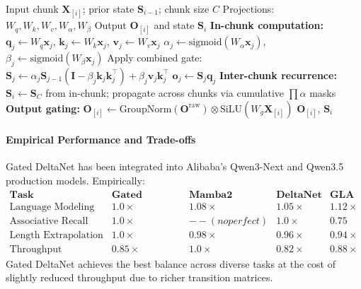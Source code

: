 \begin{algorithm}[H]
\caption{Gated DeltaNet Parallel Chunkwise Forward}
\begin{algorithmic}[1]
\Require Input chunk  $\mathbf{X}_{[i]}$; prior state $\mathbf{S}_{i-1}$; chunk size $C$
\Require Projections: $W_q, W_k, W_v, W_\alpha, W_\beta$
\Ensure Output $\mathbf{O}_{[i]}$ and state $\mathbf{S}_i$
\State \textbf{In-chunk computation:}
    \State $\mathbf{q}_j \gets W_q \mathbf{x}_j$, $\mathbf{k}_j \gets W_k \mathbf{x}_j$, $\mathbf{v}_j \gets W_v \mathbf{x}_j$
    \State $\alpha_j \gets \text{sigmoid}(W_\alpha \mathbf{x}_j)$, $\beta_j \gets \text{sigmoid}(W_\beta \mathbf{x}_j)$
    \State Apply combined gate: $\mathbf{S}_j \gets \alpha_j \mathbf{S}_{j-1}(\mathbf{I} - \beta_j \mathbf{k}_j \mathbf{k}_j^\top) + \beta_j \mathbf{v}_j \mathbf{k}_j^\top$
    \State $\mathbf{o}_j \gets \mathbf{S}_j \mathbf{q}_j$
\EndFor
\State \textbf{Inter-chunk recurrence:}
\State $\mathbf{S}_i \gets \mathbf{S}_C$ from in-chunk; propagate across chunks via cumulative $\prod \alpha$ masks
\State \textbf{Output gating:} $\mathbf{O}_{[i]} \gets \text{GroupNorm}(\mathbf{O}^\text{raw}) \otimes \text{SiLU}(W_g \mathbf{X}_{[i]})$
\Return $\mathbf{O}_{[i]}$, $\mathbf{S}_i$
\end{algorithmic}
\end{algorithm}

\paragraph{Empirical Performance and Trade-offs}

Gated DeltaNet has been integrated into Alibaba's Qwen3-Next and Qwen3.5 production models. Empirically:
\[
\begin{array}{l|cccc}
\textbf{Task} & \textbf{Gated DeltaNet} & \textbf{Mamba2} & \textbf{DeltaNet} & \textbf{GLA} \\
\hline
\text{Language Modeling} & \mathbf{1.0\times} & 1.08\times & 1.05\times & 1.12\times \\
\text{Associative Recall} & \mathbf{1.0\times} & --(no perfect) & \mathbf{1.0\times} & 0.75 \\
\text{Length Extrapolation} & \mathbf{1.0\times} & 0.98\times & 0.96\times & 0.94\times \\
\text{Throughput (tokens/sec)} & 0.85\times & \mathbf{1.0\times} & 0.82\times & 0.88\times
\end{array}
\]
Gated DeltaNet achieves the best balance across diverse tasks at the cost of slightly reduced throughput due to richer transition matrices.


